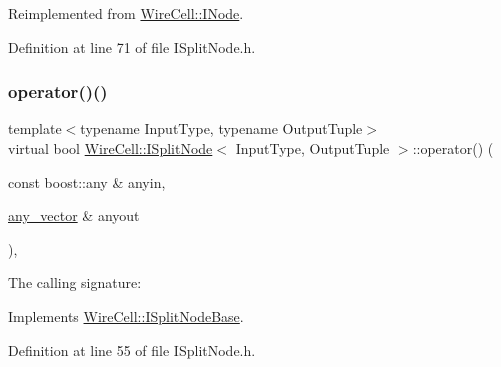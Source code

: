 Reimplemented from \hyperlink{class_wire_cell_1_1_i_node_ae13fc140c8e815fac9327dfa5b43f853}{Wire\+Cell\+::\+I\+Node}.



Definition at line 71 of file I\+Split\+Node.\+h.

\mbox{\label{class_wire_cell_1_1_i_split_node_a7c33f98661c236a21d093bb40374186b}} 
\subsubsection{\texorpdfstring{operator()()}{operator()()}\hspace{0.1cm}{\footnotesize\ttfamily [1/2]}}
{\footnotesize\ttfamily template$<$typename Input\+Type, typename Output\+Tuple$>$ \\
virtual bool \hyperlink{class_wire_cell_1_1_i_split_node}{Wire\+Cell\+::\+I\+Split\+Node}$<$ Input\+Type, Output\+Tuple $>$\+::operator() (\begin{DoxyParamCaption}\item[{const boost\+::any \&}]{anyin,  }\item[{\hyperlink{class_wire_cell_1_1_i_split_node_base_af68870ead16af4b29a3b0d486f217fe8}{any\+\_\+vector} \&}]{anyout }\end{DoxyParamCaption})\hspace{0.3cm}{\ttfamily [inline]}, {\ttfamily [virtual]}}



The calling signature\+: 



Implements \hyperlink{class_wire_cell_1_1_i_split_node_base_a40983dc11d8835581d0abcd1989cbc44}{Wire\+Cell\+::\+I\+Split\+Node\+Base}.



Definition at line 55 of file I\+Split\+Node.\+h.

\mbox{\label{class_wire_cell_1_1_i_split_node_aa0a69c19d5dacc4ebf3c6acec4120933}} 
